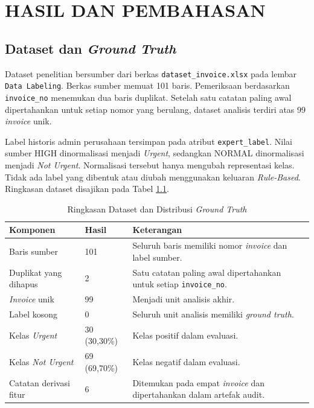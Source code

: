\chapter{HASIL DAN PEMBAHASAN}

\section{Dataset dan \textit{Ground Truth}}

Dataset penelitian bersumber dari berkas \texttt{dataset\_invoice.xlsx} pada lembar \texttt{Data Labeling}. Berkas sumber memuat 101 baris. Pemeriksaan berdasarkan \texttt{invoice\_no} menemukan dua baris duplikat. Setelah satu catatan paling awal dipertahankan untuk setiap nomor yang berulang, dataset analisis terdiri atas 99 \textit{invoice} unik.

Label historis admin perusahaan tersimpan pada atribut \texttt{expert\_label}. Nilai sumber HIGH dinormalisasi menjadi \textit{Urgent}, sedangkan NORMAL dinormalisasi menjadi \textit{Not Urgent}. Normalisasi tersebut hanya mengubah representasi kelas. Tidak ada label yang dibentuk atau diubah menggunakan keluaran \textit{Rule-Based}. Ringkasan dataset disajikan pada Tabel \ref{tab:ringkasan-dataset-bab-empat}.

\begin{table}[htbp]
    \centering
    \caption{Ringkasan Dataset dan Distribusi \textit{Ground Truth}}
    \label{tab:ringkasan-dataset-bab-empat}
    \small
    \renewcommand{\arraystretch}{1.2}
    \begin{tabularx}{\textwidth}{p{}p{}X}
        \toprule
        \textbf{Komponen} & \textbf{Hasil} & \textbf{Keterangan} \\
        \midrule
        Baris sumber & 101 & Seluruh baris memiliki nomor \textit{invoice} dan label sumber. \\
        Duplikat yang dihapus & 2 & Satu catatan paling awal dipertahankan untuk setiap \texttt{invoice\_no}. \\
        \textit{Invoice} unik & 99 & Menjadi unit analisis akhir. \\
        Label kosong & 0 & Seluruh unit analisis memiliki \textit{ground truth}. \\
        Kelas \textit{Urgent} & 30 (30,30\%) & Kelas positif dalam evaluasi. \\
        Kelas \textit{Not Urgent} & 69 (69,70\%) & Kelas negatif dalam evaluasi. \\
        Catatan derivasi fitur & 6 & Ditemukan pada empat \textit{invoice} dan dipertahankan dalam artefak audit. \\
        \bottomrule
    \end{tabularx}
\end{table}

